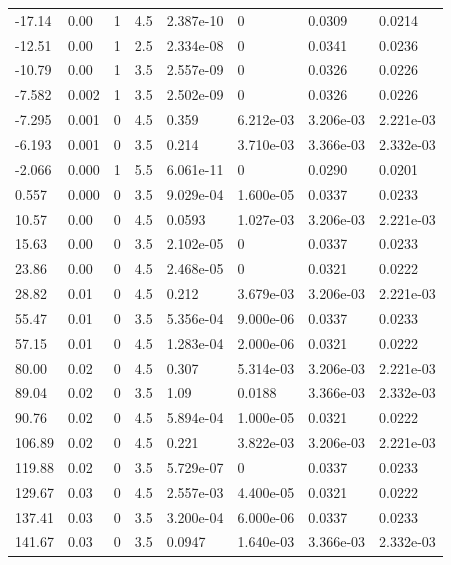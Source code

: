 \documentclass[preview]{standalone}
\begin{document}
{{\begin{tabular}{L{1.2cm}C{1.2cm} C{0.3cm}C{0.5cm} C{1.4cm}C{1.4cm} C{1.4cm}C{1.4cm}}
  -17.14  &  0.00  & 1     & 4.5 &  2.387e-10  & 0  & 0.0309 &  0.0214   \\ 
  -12.51  &  0.00  & 1     & 2.5 &  2.334e-08  & 0  & 0.0341 &  0.0236   \\ 
  -10.79  &  0.00  & 1     & 3.5 &  2.557e-09  & 0  & 0.0326 &  0.0226   \\ 
  -7.582  &  0.002  & 1     & 3.5 &  2.502e-09  & 0  & 0.0326 &  0.0226   \\ 
  -7.295  &  0.001  & 0     & 4.5 &  0.359  & 6.212e-03  & 3.206e-03 &  2.221e-03   \\ 
  -6.193  &  0.001  & 0     & 3.5 &  0.214  & 3.710e-03  & 3.366e-03 &  2.332e-03   \\ 
  -2.066  &  0.000  & 1     & 5.5 &  6.061e-11  & 0  & 0.0290 &  0.0201   \\ 
  0.557  &  0.000  & 0     & 3.5 &  9.029e-04  & 1.600e-05  & 0.0337 &  0.0233   \\ 
  10.57  &  0.00  & 0     & 4.5 &  0.0593  & 1.027e-03  & 3.206e-03 &  2.221e-03   \\ 
  15.63  &  0.00  & 0     & 3.5 &  2.102e-05  & 0  & 0.0337 &  0.0233   \\ 
  23.86  &  0.00  & 0     & 4.5 &  2.468e-05  & 0  & 0.0321 &  0.0222   \\ 
  28.82  &  0.01  & 0     & 4.5 &  0.212  & 3.679e-03  & 3.206e-03 &  2.221e-03   \\ 
  55.47  &  0.01  & 0     & 3.5 &  5.356e-04  & 9.000e-06  & 0.0337 &  0.0233   \\ 
  57.15  &  0.01  & 0     & 4.5 &  1.283e-04  & 2.000e-06  & 0.0321 &  0.0222   \\ 
  80.00  &  0.02  & 0     & 4.5 &  0.307  & 5.314e-03  & 3.206e-03 &  2.221e-03   \\ 
  89.04  &  0.02  & 0     & 3.5 &  1.09  & 0.0188  & 3.366e-03 &  2.332e-03   \\ 
  90.76  &  0.02  & 0     & 4.5 &  5.894e-04  & 1.000e-05  & 0.0321 &  0.0222   \\ 
  106.89  &  0.02  & 0     & 4.5 &  0.221  & 3.822e-03  & 3.206e-03 &  2.221e-03   \\ 
  119.88  &  0.02  & 0     & 3.5 &  5.729e-07  & 0  & 0.0337 &  0.0233   \\ 
  129.67  &  0.03  & 0     & 4.5 &  2.557e-03  & 4.400e-05  & 0.0321 &  0.0222   \\ 
  137.41  &  0.03  & 0     & 3.5 &  3.200e-04  & 6.000e-06  & 0.0337 &  0.0233   \\ 
  141.67  &  0.03  & 0     & 3.5 &  0.0947  & 1.640e-03  & 3.366e-03 &  2.332e-03   \\ 

\end{tabular}}}
\end{document}
